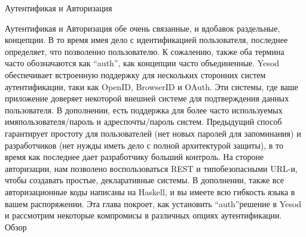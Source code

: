 Аутентификая и Авторизация

Аутентификая и Авторизация обе очень связанные, и вдобавок раздельные, концепции. В то время имея дело с идентификацией пользователя, последнее определяет, что позволенно пользователю. К сожалению, также оба термина часто обозначаются как \textquotedblleft auth\textquotedblright, как концепции часто объединенные.
Yesod обеспечивает встроенную поддержку для нескольких сторонних систем аутентификации, таки как OpenID, BrowserID и OAuth. Эти системы, где ваше приложение доверяет некоторой внешней системе для подтверждения данных пользователя. В дополнении, есть поддержка для более часто используемых имяпользователя/пароль и адреспочты/пароль систем. Предыдущий способ гарантирует простоту для пользователей (нет новых паролей для запоминания) и разработчиков (нет нужды иметь дело с полной архитектурой защиты), в то время как последнее дает разработчику больший контроль.
На стороне авторизации, нам позволено воспользоваться REST и типобезопасными URL-и, чтобы создавать простые, декларативные системы. В дополнении, также все авторизационные коды написаны на Haskell, и вы имеете всю гибкость языка в вашем распоряжении.
Эта глава покроет, как установить \textquotedblleft auth\textquotedblright решение в Yesod и рассмотрим некоторые компромисы в различных опциях аутентификации.
Обзор

